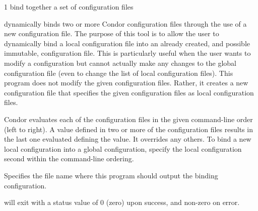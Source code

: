 \begin{ManPage}{\label{man-condor-config-bind}}{1}
{bind together a set of configuration files}

\Synopsis {}



\Description

 dynamically binds two or more Condor
configuration files through the use of a new configuration file.  The
purpose of this tool is to allow the user to dynamically bind a local
configuration file into an already created, and possible immutable,
configuration file.  This is particularly useful when the user wants to
modify a configuration but cannot actually make any changes to the
global configuration file (even to change the list of local configuration
files).  This program does not modify the given configuration files.
Rather, it creates a new configuration file that specifies the given
configuration files as local configuration files.  

Condor evaluates each of the configuration files in the given
command-line order (left to right).
A value defined 
in two or more of the configuration files results in
the last one evaluated defining the value. It overrides any others.
To bind a new local configuration into a global configuration, 
specify the local configuration second within the command-line
ordering.

\begin{Options}
   {
    Specifies the file name where this program should output the
    binding configuration. 
  }
\end{Options}

\ExitStatus

 will exit with a status value of 0 (zero) upon
success, and non-zero on error.

\end{ManPage}
